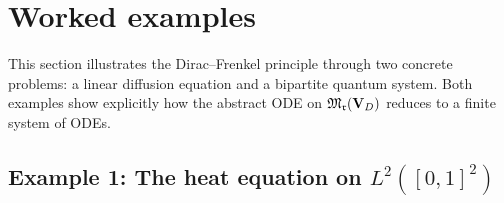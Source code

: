 \section{Worked examples}
\label{sec:DF:examples}

This section illustrates the Dirac--Frenkel principle through two
concrete problems: a linear diffusion equation and a bipartite quantum
system. Both examples show explicitly how the abstract ODE on
$\mathfrak{M}_{\mathfrak{r}}(\mathbf{V}_D)$ reduces to a finite system of ODEs.

\subsection*{Example 1: The heat equation on $L^2([0,1]^2)$}

